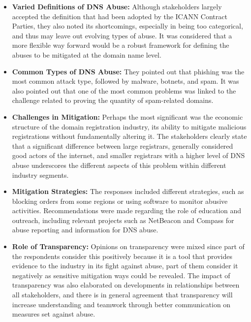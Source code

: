 \begin{itemize}
  \item \textbf{Varied Definitions of DNS Abuse:} Although stakeholders largely accepted the definition that had been adopted by the ICANN Contract Parties, they also noted its shortcomings, especially in being too categorical, and thus may leave out evolving types of abuse. It was considered that a more flexible way forward would be a robust framework for defining the abuses to be mitigated at the domain name level.
  
  \item \textbf{Common Types of DNS Abuse:} They pointed out that phishing was the most common attack type, followed by malware, botnets, and spam. It was also pointed out that one of the most common problems was linked to the challenge related to proving the quantity of spam-related domains.
  
  \item \textbf{Challenges in Mitigation:} Perhaps the most significant was the economic structure of the domain registration industry, its ability to mitigate malicious registrations without fundamentally altering it. The stakeholders clearly state that a significant difference between large registrars, generally considered good actors of the internet, and smaller registrars with a higher level of DNS abuse underscores the different aspects of this problem within different industry segments.
  
  \item \textbf{Mitigation Strategies:} The responses included different strategies, such as blocking orders from some regions or using software to monitor abusive activities. Recommendations were made regarding the role of education and outreach, including relevant projects such as NetBeacon and Compass for abuse reporting and information for DNS abuse.
  
  \item \textbf{Role of Transparency:} Opinions on transparency were mixed since part of the respondents consider this positively because it is a tool that provides evidence to the industry in its fight against abuse, part of them consider it negatively as sensitive mitigation ways could be revealed. The impact of transparency was also elaborated on developments in relationships between all stakeholders, and there is in general agreement that transparency will increase understanding and teamwork through better communication on measures set against abuse.
  
\end{itemize}

